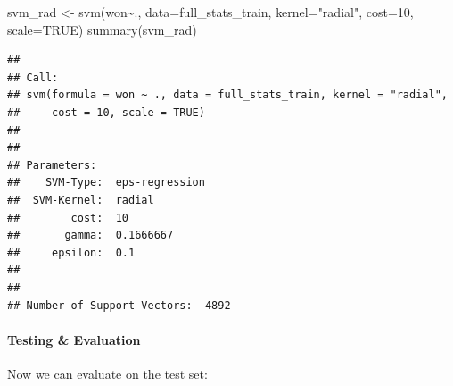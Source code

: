 \documentclass[
]{article}
\newenvironment{Shaded}{\begin{snugshade}}{\end{snugshade}}
\newcommand{\AttributeTok}[1]{\textcolor[rgb]{0.77,0.63,0.00}{#1}}
\newcommand{\ConstantTok}[1]{\textcolor[rgb]{0.00,0.00,0.00}{#1}}
\newcommand{\DecValTok}[1]{\textcolor[rgb]{0.00,0.00,0.81}{#1}}
\newcommand{\FloatTok}[1]{\textcolor[rgb]{0.00,0.00,0.81}{#1}}
\newcommand{\FunctionTok}[1]{\textcolor[rgb]{0.00,0.00,0.00}{#1}}
\newcommand{\NormalTok}[1]{#1}
\newcommand{\OtherTok}[1]{\textcolor[rgb]{0.56,0.35,0.01}{#1}}
\newcommand{\SpecialCharTok}[1]{\textcolor[rgb]{0.00,0.00,0.00}{#1}}
\newcommand{\StringTok}[1]{\textcolor[rgb]{0.31,0.60,0.02}{#1}}
\begin{document}
\begin{Shaded}
\begin{Highlighting}[]
\NormalTok{svm\_rad }\OtherTok{\textless{}{-}} \FunctionTok{svm}\NormalTok{(won}\SpecialCharTok{\textasciitilde{}}\NormalTok{., }\AttributeTok{data=}\NormalTok{full\_stats\_train, }\AttributeTok{kernel=}\StringTok{"radial"}\NormalTok{, }\AttributeTok{cost=}\DecValTok{10}\NormalTok{, }\AttributeTok{scale=}\ConstantTok{TRUE}\NormalTok{)}
\FunctionTok{summary}\NormalTok{(svm\_rad)}
\end{Highlighting}
\end{Shaded}

\begin{verbatim}
## 
## Call:
## svm(formula = won ~ ., data = full_stats_train, kernel = "radial", 
##     cost = 10, scale = TRUE)
## 
## 
## Parameters:
##    SVM-Type:  eps-regression 
##  SVM-Kernel:  radial 
##        cost:  10 
##       gamma:  0.1666667 
##     epsilon:  0.1 
## 
## 
## Number of Support Vectors:  4892
\end{verbatim}

\hypertarget{testing-evaluation-2}{%
\paragraph{Testing \& Evaluation}\label{testing-evaluation-2}}

Now we can evaluate on the test set:

\begin{Shaded}
\end{Shaded}
\end{document}
